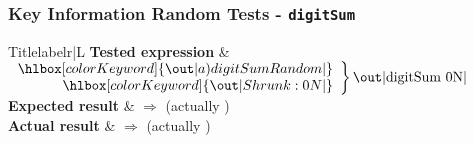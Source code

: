 \subsubsection{Key Information Random Tests - \texttt{digitSum}} %


\begin{tcbtabular}{Title}{label}{r|L}{\normalsize}
	\textbf{Tested expression} &
	$\left.\begin{array}{rr}
		\hlbox[colorKeyword]{\out|a) digitSum Random|}\\
		\hlbox[colorKeyword]{\out|Shrunk: 0N|}
	\end{array}\right\}
	\text{\out|digitSum 0N|}$\\\hline
	\textbf{Expected result} &  $\Longrightarrow$  (actually )\\\hline
	\textbf{Actual result} &  $\Longrightarrow$  (actually )
\end{tcbtabular}


